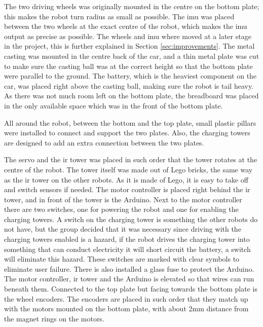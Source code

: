 The two driving wheels was originally mounted in the centre on the bottom plate; this makes the robot turn radius as small as possible. The \acrshort{imu} was placed between the two wheels at the exact centre of the robot, which makes the \acrshort{imu} output as precise as possible. The wheels and \acrshort{imu} where moved at a later stage in the project, this is further explained in Section \ref{sec:improvements}. The metal casting was mounted in the centre back of the car, and a thin metal plate was cut to make sure the casting ball was at the correct height so that the bottom plate were parallel to the ground. The battery, which is the heaviest component on the car, was placed right above the casting ball, making sure the robot is tail heavy. As there was not much room left on the bottom plate, the breadboard was placed in the only available space which was in the front of the bottom plate.

All around the robot, between the bottom and the top plate, small plastic pillars were installed to connect and support the two plates. Also, the charging towers are designed to add an extra connection between the two plates.

The servo and the \acrshort{ir} tower was placed in such order that the tower rotates at the centre of the robot. The tower itself was made out of Lego bricks, the same way as the \acrshort{ir} tower on the other robots. As it is made of Lego, it is easy to take off and switch sensors if needed. The motor controller is placed right behind the \acrshort{ir} tower, and in front of the tower is the Arduino. Next to the motor controller there are two switches, one for powering the robot and one for enabling the charging towers. A switch on the charging tower is something the other robots do not have, but the group decided that it was necessary since driving with the charging towers enabled is a hazard, if the robot drives the charging tower into something that can conduct electricity it will short circuit the battery, a switch will eliminate this hazard. These switches are marked with clear symbols to eliminate user failure. There is also installed a glass fuse to protect the Arduino. The motor controller, \acrshort{ir} tower and the Arduino is elevated so that wires can run beneath them. Connected to the top plate but facing towards the bottom plate is the wheel encoders. The encoders are placed in such order that they match up with the motors mounted on the bottom plate, with about 2mm distance from the magnet rings on the motors.

